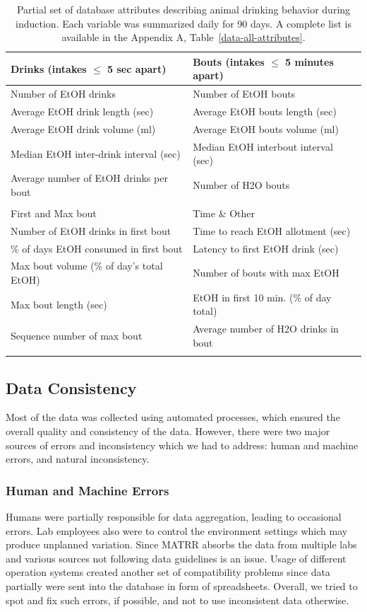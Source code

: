		\begin{table}[!t]
		\centering
		\caption{Partial set of database attributes describing animal drinking behavior during induction. Each variable was summarized daily for 90 days. A complete list is available in the Appendix A, Table~\ref{data-all-attributes}.}
		\label{data-selected-attributes}
		\begin{tabular}{ll}
			\hline
			\abovespace\belowspace
			Drinks (intakes $\le$ 5 sec apart)&	Bouts (intakes $\le$ 5 minutes apart)\\
			\hline
			Number of EtOH drinks& 	Number of EtOH bouts\\
			Average EtOH drink length (sec)&	Average EtOH bouts length (sec)\\
			Average EtOH drink volume (ml)& 	Average EtOH bouts volume (ml)\\
			Median EtOH inter-drink interval (sec)& Median EtOH interbout interval (sec)\\
			Average number of EtOH drinks per bout& Number of H2O bouts\\	 	 
			\belowspace \\
			\hline
			\abovespace\belowspace
			First and Max bout &	Time \& Other \\
			\hline
			Number of EtOH drinks in first bout& Time to reach EtOH allotment (sec) \\
			\% of days EtOH consumed in first bout& Latency to first EtOH drink (sec) \\
			Max bout volume (\% of day's total EtOH) & Number of bouts with max EtOH \\
			Max bout length (sec) &	EtOH in first 10 min. (\% of day total)\\
			Sequence number	of max bout & Average number of H2O drinks in bout \\	 	 
			\belowspace \\
			\hline
		\end{tabular}
		\end{table}

	\subsection{Data Consistency}
	Most of the data was collected using automated processes, which ensured the overall quality and consistency of the data. However, there were two major sources of errors and inconsistency which we had to address: human and machine errors, and natural inconsistency.
	
		\subsubsection{Human and Machine Errors}
		Humans were partially responsible for data aggregation, leading to occasional errors. Lab employees also were to control the environment settings which may produce unplanned variation. Since MATRR absorbs the data from multiple labs and various sources not following data guidelines is an issue. Usage of different operation systems created another set of compatibility problems since data partially were sent into the database in form of spreadsheets. Overall, we tried to spot and fix such errors, if possible, and not to use inconsistent data otherwise.
		
